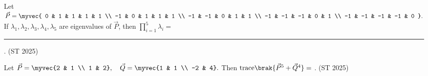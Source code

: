 \item Let  
$
\vec{P}=\myvec{
0 & 1 & 1 & 1 & 1 \\
-1 & 0 & 1 & 1 & 1 \\
-1 & -1 & 0 & 1 & 1 \\
-1 & -1 & -1 & 0 & 1 \\
-1 & -1 & -1 & -1 & 0
}.
$
If $\lambda_1,\lambda_2,\lambda_3,\lambda_4,\lambda_5$ are eigenvalues of $\vec{P}$, then $\prod_{i=1}^5 \lambda_i =$ \rule{1cm}{0.01pt}.
\hfill{(ST 2025)}
\item Let  
$
\vec{P}=\myvec{2 & 1 \\ 1 & 2}, 
\quad 
\vec{Q}=\myvec{1 & 1 \\ -2 & 4}.
$
Then $\text{trace}\brak{\vec{P}^5+\vec{Q}^4}=$ \underline{\phantom{imagine}}.
\hfill{(ST 2025)}
